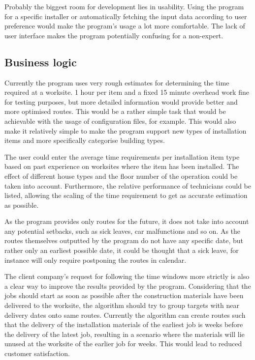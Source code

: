 Probably the biggest room for development lies in usability. Using the program for a specific installer or automatically fetching the input data according to user preference would make the program's usage a lot more comfortable. The lack of user interface makes the program potentially confusing for a non-expert.


\subsection{Business logic}

Currently the program uses very rough estimates for determining the time required at a worksite. 1 hour per item and a fixed 15 minute overhead work fine for testing purposes, but more detailed information would provide better and more optimised routes. This would be a rather simple task that would be achievable with the usage of configuration files, for example. This would also make it relatively simple to make the program support new types of installation items and more specifically categorise building types.

The user could enter the average time requirements per installation item type based on past experience on worksites where the item has been installed. The effect of different house types and the floor number of the operation could be taken into account. Furthermore, the relative performance of technicians could be listed, allowing the scaling of the time requirement to get as accurate estimation as possible.

As the program provides only routes for the future, it does not take into account any potential setbacks, such as sick leaves, car malfunctions and so on. As the routes themselves outputted by the program do not have any specific date, but rather only an earliest possible date, it could be thought that a sick leave, for instance will only require postponing the routes in calendar.  

The client company's request for following the time windows more strictly is also a clear way to improve the results provided by the program. Considering that the jobs should start as soon as possible after the construction materials have been delivered to the worksite, the algorithm should try to group targets with near delivery dates onto same routes. Currently the algorithm can create routes such that the delivery of the installation materials of the earliest job is weeks before the delivery of the latest job, resulting in a scenario where the materials will lie unused at the worksite of the earlier job for weeks. This would lead to reduced customer satisfaction.

